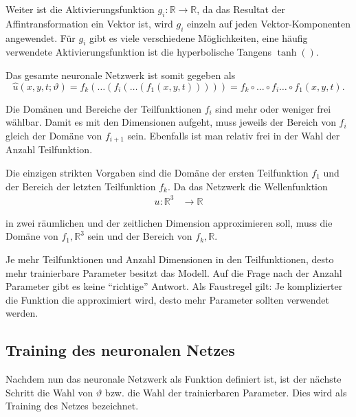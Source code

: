Weiter ist die Aktivierungsfunktion \( g_i\colon \mathbb{R} \longrightarrow\mathbb{R} \), da das Resultat der Affintransformation ein Vektor ist, wird \( g_i \) einzeln auf jeden Vektor-Komponenten angewendet.
Für \( g_i \) gibt es viele verschiedene Möglichkeiten, eine häufig verwendete Aktivierungsfunktion ist die hyperbolische Tangens \( \tanh() \).

Das gesamte neuronale Netzwerk ist somit gegeben als
\begin{equation}
    \hat{u}(x, y, t; \vartheta) = f_k(\ldots(f_i(\ldots(f_1(x, y, t))))) = f_k \circ \ldots \circ f_i \ldots \circ f_1(x, y, t).
    \label{neuronal:nn_ausformuliert}
\end{equation}

Die Domänen und Bereiche der Teilfunktionen \( f_i \) sind mehr oder weniger frei wählbar.
Damit es mit den Dimensionen aufgeht, muss jeweils der Bereich von \( f_i \) gleich der Domäne von \( f_{i+1} \) sein.
Ebenfalls ist man relativ frei in der Wahl der Anzahl Teilfunktion.

Die einzigen strikten Vorgaben sind die Domäne der ersten Teilfunktion \( f_1 \) und der Bereich der letzten Teilfunktion \( f_k \).
Da das Netzwerk die Wellenfunktion
\begin{align*}
    u\colon \mathbb{R}^3 & \longrightarrow\mathbb{R}
\end{align*}

in zwei räumlichen und der zeitlichen Dimension approximieren soll, muss die Domäne von \( f_1, \mathbb{R}^3\) sein und der Bereich von \( f_k, \mathbb{R}\).

Je mehr Teilfunktionen und Anzahl Dimensionen in den Teilfunktionen, desto mehr trainierbare Parameter besitzt das Modell.
Auf die Frage nach der Anzahl Parameter gibt es keine ``richtige'' Antwort.
Als Faustregel gilt: Je komplizierter die Funktion die approximiert wird, desto mehr Parameter sollten verwendet werden.



\subsection{Training des neuronalen Netzes}\label{neuronal:subsection:training_nn}

Nachdem nun das neuronale Netzwerk als Funktion definiert ist, ist der nächste Schritt die Wahl von \( \vartheta \) bzw. die Wahl der trainierbaren Parameter.
Dies wird als Training des Netzes bezeichnet.

